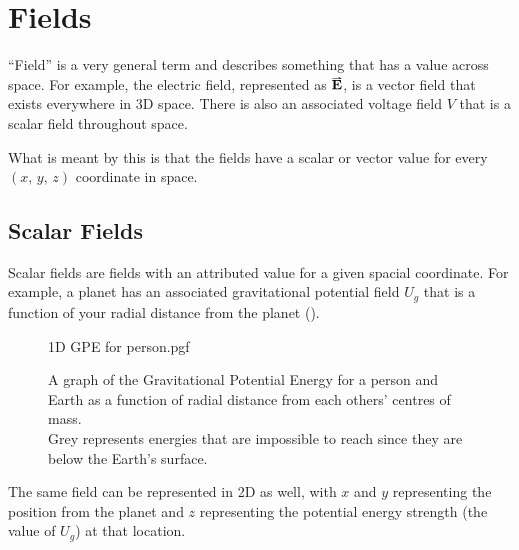 \documentclass[main.tex]{subfiles}
\begin{document}

    \chapter{Fields}
        \label{ch: Fields}
        \thispagestyle{noheader}

        ``Field'' is a very general term and describes something that has a value across space. For example, the electric field, represented as $\vect{E}$, is a vector field that exists everywhere in 3D space. There is also an associated voltage field $V$ that is a scalar field throughout space.

        What is meant by this is that the fields have a scalar or vector value for every $(x,\, y,\, z)$ coordinate in space.

        \section{Scalar Fields}
            \label{sec: Scalar Fields}

            Scalar fields are fields with an attributed value for a given spacial coordinate. For example, a planet has an associated gravitational potential field $U_g$ that is a function of your radial distance from the planet ().

            \begin{figure}[!h]
                \centering
                \scalebox{0.7}
                {
                    \begin{adjustbox}{clip,trim=5mm 10mm 10mm 10mm}
                        {{1D GPE for person.pgf}}
                    \end{adjustbox}
                }
                \vspace{-2mm}
                \caption{A graph of the Gravitational Potential Energy for a person and Earth as a function of radial distance from each others' centres of mass.\\
                Grey represents energies that are impossible to reach since they are below the Earth's surface.}
                \label{fig: 1D GPE}
            \end{figure}

            The same field can be represented in 2D as well, with $x$ and $y$ representing the position from the planet and $z$ representing the potential energy strength (the value of $U_g$) at that location.
\end{document}
